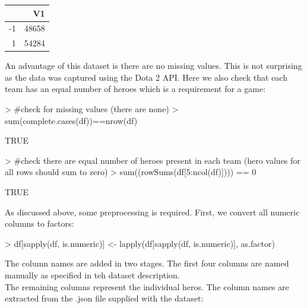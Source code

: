 \documentclass[10pt]{article}
\begin{document}
\begin{table}[ht]
\centering
\begin{tabular}{rr}
  \hline
 & V1 \\ 
  \hline
-1 & 48658 \\ 
  1 & 54284 \\ 
   \hline
\end{tabular}
\end{table}

An advantage of this dataset is there are no missing values. This is not surprising as the data was captured using the Dota 2 API. Here we also check that each team has an equal number of heroes which is a requirement for a game:

\begin{Schunk}
\begin{Sinput}
> #check for missing values (there are none)
> sum(complete.cases(df))==nrow(df)
\end{Sinput}
\begin{Soutput}
[1] TRUE
\end{Soutput}
\begin{Sinput}
> #check there are equal number of heroes present in each team (hero values for all rows should sum to zero)
> sum((rowSums(df[5:ncol(df)]))) == 0
\end{Sinput}
\begin{Soutput}
[1] TRUE
\end{Soutput}
\end{Schunk}

As discussed above, some preprocessing is required. First, we convert all numeric columns to factors:
\begin{Schunk}
\begin{Sinput}
> df[sapply(df, is.numeric)] <- lapply(df[sapply(df, is.numeric)], as.factor)
\end{Sinput}
\end{Schunk}

The column names are added in two stages. The first four columns are named manually as specified in teh dataset description.\\
The remaining columns represent the individual heros. The column names are extracted from the .json file supplied with the dataset:
\begin{Schunk}
\end{Schunk}
\end{document}
